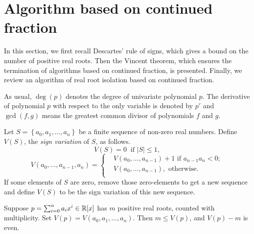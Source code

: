 
\section{Algorithm based on  continued fraction}
\label{sec:contalg}
In this section, we first recall Descartes' rule of signs, which gives a bound on the number of positive real roots. Then the Vincent theorem, which  ensures
the termination of algorithms based on  continued fraction, is presented. Finally, we review an algorithm of real root isolation based on  continued fraction.

As usual, $\deg(p)$ denotes the degree of univariate polynomial $p$. The derivative of polynomial $p$ with respect to the only variable is denoted by $p'$ and $\gcd(f,g)$ means the greatest common divisor of polynomials $f$ and $g$.

\begin{note}
Let $S=\left\{ a_0,a_1,\ldots,a_n \right\}$ be a finite sequence of non-zero real numbers. Define $V(S)$, the {\em sign variation} of $S$, as follows.
\[V(S)=0\ \text{ if } |S|\le1,\]
\[  V(a_0,\ldots,a_{n-1},a_n)=  \left\{\begin{aligned}
 &  V(a_0,\ldots,a_{n-1})+1 \text{ if }a_{n-1}a_n<0;\\
&V(a_0,\ldots,a_{n-1}), \text{ otherwise}.\\
	\end{aligned}
	\right.
\]
If some elements of $S$ are zero, remove those zero-elements to get a new sequence and define $V(S)$ to be the sign variation of this new sequence.
\end{note}





\begin{theorem} \label{thm:des}
  Suppose $p=\sum_{i=0}^na_ix^i\in{\mathbb R}[x]$ has $m$ positive real roots, counted with multiplicity. Set $V(p)=V(a_0,a_1,\ldots,a_n)$. Then $m\le V(p)$, and $V(p)-m$ is even.
\end{theorem}



